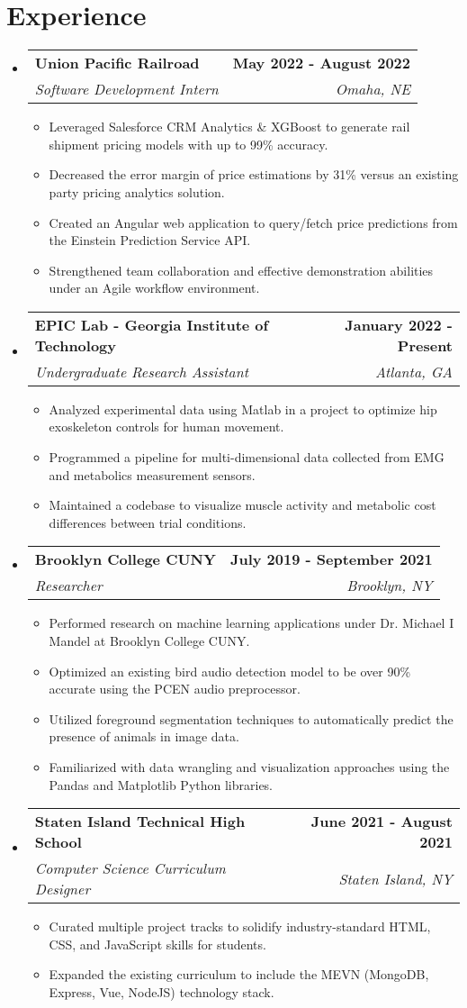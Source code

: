 \documentclass[letterpaper,11pt]{article}
\makeatletter
\newcommand{\resumeItem}[1]{
  \item\small{
    {#1 \vspace{-2pt}}
  }
}
\newcommand{\resumeSubheading}[4]{
  \vspace{-2pt}\item
    \begin{tabular*}{1.0\textwidth}[t]{l@{\extracolsep{\fill}}r}
      \textbf{#1} & \textbf{\small #2} \\
      \textit{\small#3} & \textit{\small #4} \\
    \end{tabular*}\vspace{-7pt}
}
\newcommand{\resumeSubHeadingListStart}{\begin{itemize}[leftmargin=0.0in, label={}]}
\newcommand{\resumeSubHeadingListEnd}{\end{itemize}}
\newcommand{\resumeItemListStart}{\begin{itemize}[leftmargin=0.15in]}
\newcommand{\resumeItemListEnd}{\end{itemize}\vspace{-5pt}}
\makeatother
\begin{document}
\section{Experience}
\resumeSubHeadingListStart
\resumeSubheading
{Union Pacific Railroad}{May 2022 - August 2022}
{Software Development Intern}{Omaha, NE}
\resumeItemListStart
\resumeItem{Leveraged Salesforce CRM Analytics \& XGBoost to generate rail shipment pricing models with up to 99\% accuracy.}
\resumeItem{Decreased the error margin of price estimations by 31\% versus an existing \nth{3} party pricing analytics solution.}
\resumeItem{Created an Angular web application to query/fetch price predictions from the Einstein Prediction Service API.}
\resumeItem{Strengthened team collaboration and effective demonstration abilities under an Agile workflow environment.}
\resumeItemListEnd
\resumeSubheading
{EPIC Lab - Georgia Institute of Technology}{January 2022 - Present}
{Undergraduate Research Assistant}{Atlanta, GA}
\resumeItemListStart
\resumeItem{Analyzed experimental data using Matlab in a project to optimize hip exoskeleton controls for human movement.}
\resumeItem{Programmed a pipeline for multi-dimensional data collected from EMG and metabolics measurement sensors.}
\resumeItem{Maintained a codebase to visualize muscle activity and metabolic cost differences between trial conditions.}
\resumeItemListEnd
\resumeSubheading
{Brooklyn College CUNY}{July 2019 - September 2021}
{Researcher}{Brooklyn, NY}
\resumeItemListStart
\resumeItem{Performed research on machine learning applications under Dr. Michael I Mandel at Brooklyn College CUNY.}
\resumeItem{Optimized an existing bird audio detection model to be over 90\% accurate using the PCEN audio preprocessor.}
\resumeItem{Utilized foreground segmentation techniques to automatically predict the presence of animals in image data.}
\resumeItem{Familiarized with data wrangling and visualization approaches using the Pandas and Matplotlib Python libraries.}
\resumeItemListEnd
\resumeSubheading
{Staten Island Technical High School}{June 2021 - August 2021}
{Computer Science Curriculum Designer}{Staten Island, NY}
\resumeItemListStart
\resumeItem{Curated multiple project tracks to solidify industry-standard HTML, CSS, and JavaScript skills for students.}
\resumeItem{Expanded the existing curriculum to include the MEVN (MongoDB, Express, Vue, NodeJS) technology stack.}
\resumeItemListEnd
\resumeSubHeadingListEnd
\vspace{-16pt}
\end{document}
